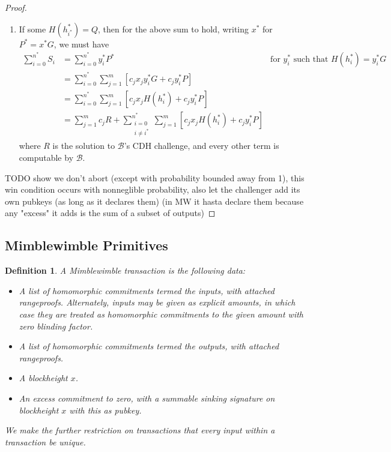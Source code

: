 \documentclass[letterpaper]{article}
\newtheorem{defn}{Definition}
\begin{document}
\begin{proof}
\begin{enumerate}
\item If some $H(h_{i^*}^*) = Q$, then for the above sum to hold, writing $x^*$
for $P^* = x^*G$, we must have
\begin{align*}
\sum_{i=0}^{n^*} S_i
    &= \sum_{i=0}^{n^*} y^*_iP^* &\text{for $y^*_i$ such that $H(h^*_i) = y^*_iG$}	\\
    &= \sum_{i=0}^{n^*} \sum_{j=1}^m [c_jx_jy^*_iG + c_jy^*_iP]	\\
    &= \sum_{i=0}^{n^*} \sum_{j=1}^m [c_jx_jH(h^*_i) + c_jy^*_iP] 	\\
    &= \sum_{j=1}^m c_j R + \sum_{\substack{i=0\\i\neq i^*}}^{n^*} \sum_{j=1}^m [c_jx_jH(h^*_i) + c_jy^*_iP]
\end{align*}
where $R$ is the solution to $\mathcal{B}$'s CDH challenge, and every other
term is computable by $\mathcal{B}$.
\end{enumerate}
TODO show we don't abort (except with probability bounded away from 1), this win condition occurs
with nonneglible probability, also let the challenger add its own pubkeys
(as long as it declares them) (in MW it hasta declare them because any
"excess" it adds is the sum of a subset of outputs)
\end{proof}

\subsection{Mimblewimble Primitives}

\begin{defn}A \emph{Mimblewimble transaction} is the following data:
\begin{itemize}
\item A list of homomorphic commitments termed the \emph{inputs},
with attached rangeproofs. Alternately, inputs may be given as
explicit amounts, in which case they are treated as homomorphic
commitments to the given amount with zero blinding factor.
\item A list of homomorphic commitments termed the \emph{outputs},
with attached rangeproofs.
\item A blockheight $x$.
\item An \emph{excess} commitment to zero, with a summable sinking
signature on blockheight $x$ with this as pubkey.
\end{itemize}
We make the further restriction on transactions that every input
within a transaction be unique.
\end{defn}
\end{document}
